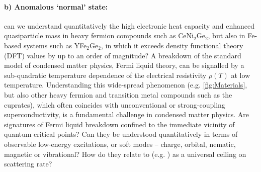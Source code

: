 \paragraph{b) Anomalous `normal' state:} %
can we understand quantitatively the high electronic heat capacity and enhanced quasiparticle mass in heavy fermion compounds such as CeNi$_2$Ge$_2$, but also in Fe-based systems such as YFe$_2$Ge$_2$, in which it exceeds density functional theory (DFT) values by up to an order of magnitude? A breakdown of the standard model of condensed matter physics, Fermi liquid theory, can be signalled by a sub-quadratic temperature dependence of the electrical resistivity $\rho(T)$ at low temperature. 
Understanding this wide-spread phenomenon  (e.g. \autoref{fig:Materials}, but also other heavy fermion and transition metal compounds such as the cuprates), which often coincides with unconventional or strong-coupling superconductivity, is a fundamental challenge in condensed matter physics. 
Are signatures of Fermi liquid breakdown confined to the immediate vicinity of quantum critical points?
Can they be understood quantitatively in terms of observable low-energy excitations, or soft modes -- charge, orbital, nematic, magnetic or vibrational? How do they relate to  (e.g. \cite{bruin13,hartnoll15}) as a universal ceiling on scattering rate? 

